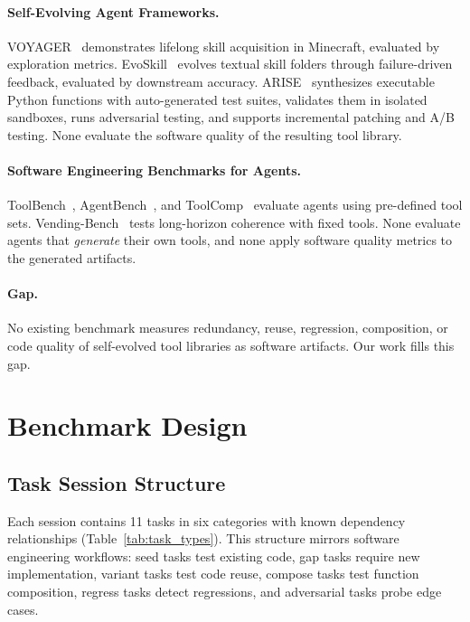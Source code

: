\documentclass[10pt,twocolumn]{article}
\begin{document}
\paragraph{Self-Evolving Agent Frameworks.} VOYAGER~\cite{wang2023voyager} demonstrates lifelong skill acquisition in Minecraft, evaluated by exploration metrics. EvoSkill~\cite{alzubi2026evoskill} evolves textual skill folders through failure-driven feedback, evaluated by downstream accuracy. ARISE~\cite{kaliyev2026arise} synthesizes executable Python functions with auto-generated test suites, validates them in isolated sandboxes, runs adversarial testing, and supports incremental patching and A/B testing. None evaluate the software quality of the resulting tool library.

\paragraph{Software Engineering Benchmarks for Agents.} ToolBench~\cite{qin2023toolbench}, AgentBench~\cite{liu2024agentbench}, and ToolComp~\cite{toolcomp2025} evaluate agents using pre-defined tool sets. Vending-Bench~\cite{backlund2025vendingbench} tests long-horizon coherence with fixed tools. None evaluate agents that \emph{generate} their own tools, and none apply software quality metrics to the generated artifacts.

\paragraph{Gap.} No existing benchmark measures redundancy, reuse, regression, composition, or code quality of self-evolved tool libraries as software artifacts. Our work fills this gap.

\section{Benchmark Design}

\subsection{Task Session Structure}

Each session contains 11 tasks in six categories with known dependency relationships (Table~\ref{tab:task_types}). This structure mirrors software engineering workflows: seed tasks test existing code, gap tasks require new implementation, variant tasks test code reuse, compose tasks test function composition, regress tasks detect regressions, and adversarial tasks probe edge cases.
\end{document}
